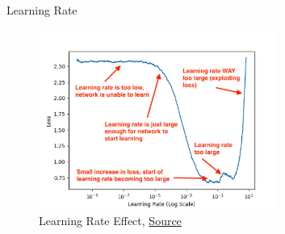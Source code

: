 \begin{frame}{Learning Rate}
	\begin{figure}[H]
		\centering
		\includegraphics[width=0.7\textwidth]{Figs/lr_high_res_2.jpg}
		\caption{Learning Rate Effect, \href{https://pyimagesearch.com/2019/08/05/keras-learning-rate-finder/}{Source}}
	\end{figure}
\end{frame}